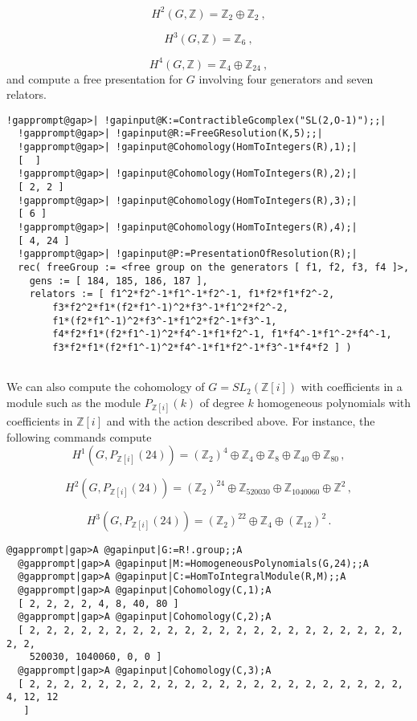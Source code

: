 \documentclass[a4paper,11pt]{report}
\begin{document}
{{\[H^2(G,\mathbb Z) =\mathbb Z_2\oplus \mathbb Z_2\ ,\]
 
\[H^3(G,\mathbb Z) =\mathbb Z_6\ ,\]
 
\[H^4(G,\mathbb Z) =\mathbb Z_4\oplus \mathbb Z_{24}\ ,\]
 and compute a free presentation for $G$ involving four generators and seven relators. 
\begin{Verbatim}[commandchars=!@|,fontsize=\small,frame=single,label=Example]
  !gapprompt@gap>| !gapinput@K:=ContractibleGcomplex("SL(2,O-1)");;|
  !gapprompt@gap>| !gapinput@R:=FreeGResolution(K,5);;|
  !gapprompt@gap>| !gapinput@Cohomology(HomToIntegers(R),1);|
  [  ]
  !gapprompt@gap>| !gapinput@Cohomology(HomToIntegers(R),2);|
  [ 2, 2 ]
  !gapprompt@gap>| !gapinput@Cohomology(HomToIntegers(R),3);|
  [ 6 ]
  !gapprompt@gap>| !gapinput@Cohomology(HomToIntegers(R),4);|
  [ 4, 24 ]
  !gapprompt@gap>| !gapinput@P:=PresentationOfResolution(R);|
  rec( freeGroup := <free group on the generators [ f1, f2, f3, f4 ]>, 
    gens := [ 184, 185, 186, 187 ], 
    relators := [ f1^2*f2^-1*f1^-1*f2^-1, f1*f2*f1*f2^-2, 
        f3*f2^2*f1*(f2*f1^-1)^2*f3^-1*f1^2*f2^-2, 
        f1*(f2*f1^-1)^2*f3^-1*f1^2*f2^-1*f3^-1, 
        f4*f2*f1*(f2*f1^-1)^2*f4^-1*f1*f2^-1, f1*f4^-1*f1^-2*f4^-1, 
        f3*f2*f1*(f2*f1^-1)^2*f4^-1*f1*f2^-1*f3^-1*f4*f2 ] )
  
\end{Verbatim}
 We can also compute the cohomology of $G=SL_2(\mathbb Z[i])$ with coefficients in a module such as the module $P_{\mathbb Z[i]}(k)$ of degree $k$ homogeneous polynomials with coefficients in $\mathbb Z[i]$ and with the action described above. For instance, the following commands
compute 
\[H^1(G,P_{\mathbb Z[i]}(24)) = (\mathbb Z_2)^4 \oplus \mathbb Z_4 \oplus
\mathbb Z_8 \oplus \mathbb Z_{40} \oplus \mathbb Z_{80}\, ,\]
 
\[H^2(G,P_{\mathbb Z[i]}(24)) = (\mathbb Z_2)^{24} \oplus \mathbb
Z_{520030}\oplus \mathbb Z_{1040060} \oplus \mathbb Z^2\, ,\]
 
\[H^3(G,P_{\mathbb Z[i]}(24)) = (\mathbb Z_2)^{22} \oplus \mathbb Z_{4}\oplus
(\mathbb Z_{12})^2 \, .\]
 
\begin{Verbatim}[commandchars=@|A,fontsize=\small,frame=single,label=Example]
  @gapprompt|gap>A @gapinput|G:=R!.group;;A
  @gapprompt|gap>A @gapinput|M:=HomogeneousPolynomials(G,24);;A
  @gapprompt|gap>A @gapinput|C:=HomToIntegralModule(R,M);;A
  @gapprompt|gap>A @gapinput|Cohomology(C,1);A
  [ 2, 2, 2, 2, 4, 8, 40, 80 ]
  @gapprompt|gap>A @gapinput|Cohomology(C,2);A
  [ 2, 2, 2, 2, 2, 2, 2, 2, 2, 2, 2, 2, 2, 2, 2, 2, 2, 2, 2, 2, 2, 2, 2, 2, 
    520030, 1040060, 0, 0 ]
  @gapprompt|gap>A @gapinput|Cohomology(C,3);A
  [ 2, 2, 2, 2, 2, 2, 2, 2, 2, 2, 2, 2, 2, 2, 2, 2, 2, 2, 2, 2, 2, 2, 4, 12, 12 
   ]
  

\end{Verbatim}}}
\end{document}
